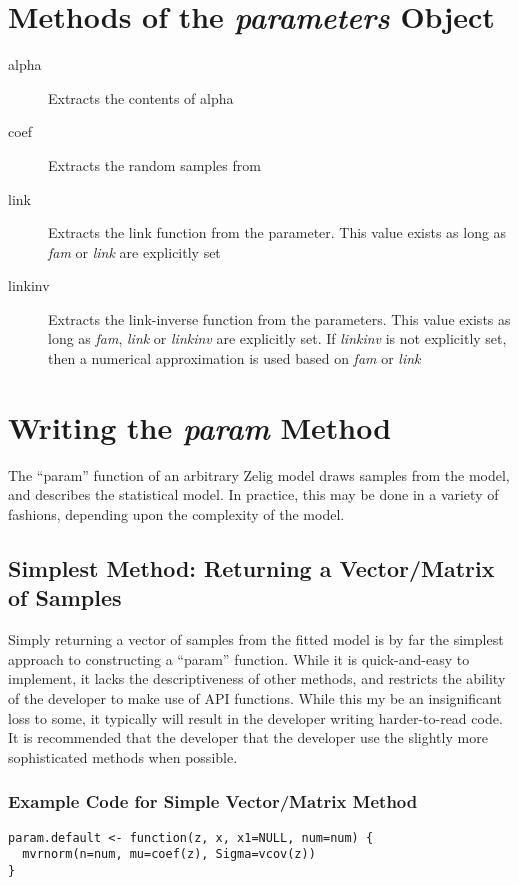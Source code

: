 \documentclass[a4paper,11pt]{article}
\begin{document}
\section{Methods of the \emph{parameters} Object}

\begin{description}
	\item[alpha]{Extracts the contents of alpha}
	\item[coef]{Extracts the random samples from }
	\item[link]{Extracts the link function from the parameter.  This value exists as long as \emph{fam} or \emph{link} are explicitly set}
	\item[linkinv]{Extracts the link-inverse function from the parameters.  This value exists as long as \emph{fam}, \emph{link} or \emph{linkinv} are explicitly set.  If \emph{linkinv} is not explicitly set, then a numerical approximation is used based on \emph{fam} or \emph{link}}
\end{description}


\section{Writing the \emph{param} Method}

The ``param'' function of an arbitrary Zelig model draws samples from the model, and describes the statistical model.  In practice, this may be done in a variety of fashions, depending upon the complexity of the model.

\subsection{Simplest Method: Returning a Vector/Matrix of Samples}

Simply returning a vector of samples from the fitted model is by far the simplest approach to constructing a ``param'' function.  While it is quick-and-easy to implement, it lacks the descriptiveness of other methods, and restricts the ability of the developer to make use of API functions.  While this my be an insignificant loss to some, it typically will result in the developer writing harder-to-read code.  It is recommended that the developer that the developer use the slightly more sophisticated methods when possible.

\subsubsection{Example Code for Simple Vector/Matrix Method}
\begin{verbatim}
param.default <- function(z, x, x1=NULL, num=num) {
  mvrnorm(n=num, mu=coef(z), Sigma=vcov(z))
}
\end{verbatim}
\end{document}
